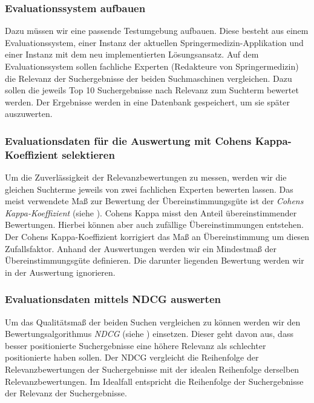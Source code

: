 {\subsubsection{Evaluationssystem aufbauen}
\label{sec:Einfuehrung:Methodik:Evaluation:Aufbau}

Dazu müssen wir eine passende Testumgebung aufbauen. Diese besteht aus einem Evaluationssystem, einer Instanz der aktuellen Springermedizin-Applikation und einer Instanz mit dem neu implementierten Lösungsansatz. Auf dem Evaluationssystem sollen fachliche Experten (Redakteure von Springermedizin) die Relevanz der Suchergebnisse  der beiden Suchmaschinen vergleichen. Dazu sollen die jeweils Top 10 Suchergebnisse nach Relevanz zum Suchterm bewertet werden. Der Ergebnisse werden in eine Datenbank gespeichert, um sie später auszuwerten. 

\subsubsection{Evaluationsdaten für die Auswertung mit Cohens Kappa-Koeffizient selektieren}
\label{sec:Einfuehrung:Methodik:Evaluation:EvaluationsdatenSelektieren}

Um die Zuverlässigkeit der Relevanzbewertungen zu messen, werden wir die gleichen Suchterme jeweils von zwei fachlichen Experten bewerten lassen. Das  meist verwendete  Maß  zur  Bewertung  der Übereinstimmungsgüte ist der \textit{Cohens Kappa-Koeffizient} (siehe \cite{Kappa}). Cohens Kappa misst den  Anteil übereinstimmender Bewertungen. Hierbei können aber auch zufällige Übereinstimmungen entstehen. Der Cohens Kappa-Koeffizient korrigiert das Maß an Übereinstimmung um diesen Zufallsfaktor. Anhand der Auswertungen werden wir ein Mindestmaß der Übereinstimmungsgüte definieren. Die darunter liegenden Bewertung werden wir in der Auswertung ignorieren. 

\subsubsection{Evaluationsdaten mittels NDCG auswerten}
\label{sec:Einfuehrung:Methodik:Evaluation:EvaluationsdatenNDCG}

Um das Qualitätsmaß der beiden Suchen vergleichen zu können werden wir den Bewertungsalgorithmus \textit{NDCG} (siehe \cite{NDCG}) einsetzen. Dieser geht davon aus, dass besser positionierte Suchergebnisse eine höhere Relevanz als schlechter positionierte haben sollen. Der NDCG vergleicht die Reihenfolge der Relevanzbewertungen der Suchergebnisse mit der idealen Reihenfolge derselben Relevanzbewertungen. Im Idealfall entspricht die Reihenfolge der Suchergebnisse der Relevanz der Suchergebnisse.

}
